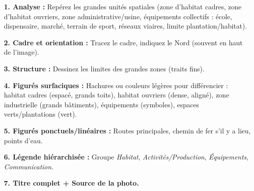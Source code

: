 \documentclass[11pt]{article}
\begin{document}
\begin{methode}
\textbf{1. Analyse :} Repérez les grandes unités spatiales (zone d'habitat cadres, zone d'habitat ouvriers, zone administrative/usine, équipements collectifs : école, dispensaire, marché, terrain de sport, réseaux viaires, limite plantation/habitat).\par
\textbf{2. Cadre et orientation :} Tracez le cadre, indiquez le Nord (souvent en haut de l'image).\par
\textbf{3. Structure :} Dessinez les limites des grandes zones (traits fins).\par
\textbf{4. Figurés surfaciques :} Hachures ou couleurs légères pour différencier : habitat cadres (espacé, grands toits), habitat ouvriers (dense, aligné), zone industrielle (grands bâtiments), équipements (symboles), espaces verts/plantations (vert).\par
\textbf{5. Figurés ponctuels/linéaires :} Routes principales, chemin de fer s'il y a lieu, points d'eau.\par
\textbf{6. Légende hiérarchisée :} Groupe \emph{Habitat}, \emph{Activités/Production}, \emph{Équipements}, \emph{Communication}.\par
\textbf{7. Titre complet + Source de la photo.}
\end{methode}
\end{document}
